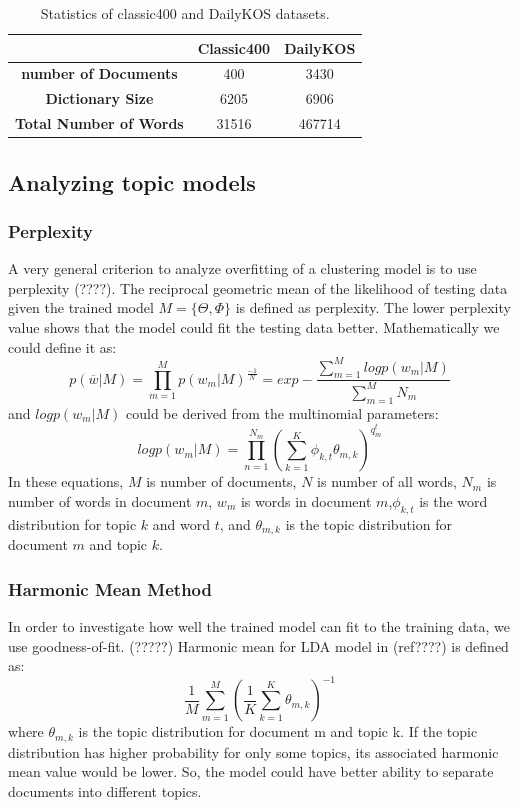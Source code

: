 \documentclass[twoside,12pt]{article}
\begin{document}
\begin{table}
\vspace{-2cm}
\center
\begin{tabular}{|c|c|c|}
\hline
 & \textbf{Classic400} & \textbf{DailyKOS} \\
 \hline
\textbf{ number of Documents} & 400 & 3430 \\
\textbf{ Dictionary Size} & 6205 & 6906 \\
\textbf{ Total Number of Words} & 31516 & 467714\\
 \hline
\end{tabular}
\caption{Statistics of classic400 and DailyKOS datasets.}
\label{tableDatasetStats}
\end{table}

\subsection{Analyzing topic models}
\subsubsection{Perplexity}
A very general criterion to analyze overfitting of a clustering model is to use perplexity (????). The reciprocal geometric mean of the likelihood of testing data given the trained model $M={\{\Theta,\Phi\}}$ is defined as perplexity. The lower perplexity value shows that the model could fit the testing data better. Mathematically we could define it as:
\begin{equation}
p(\overline{w}|M)=\prod_{m=1}^M p(w_m|M)^{\frac{-1}{N}}=exp - \frac{\sum_{m=1}^Ml og p(w_m|M)}{\sum_{m=1}^M N_m}
\end{equation}
and $log p(w_m|M)$ could be derived from the multinomial parameters:
\begin{equation}
log p(w_m|M)=\prod_{n=1}^{N_m}(\sum_{k=1}^{K} \phi_{k,t}\theta_{m,k})^{q_m^t}
\end{equation}
In these equations, $M$ is number of documents, $N$ is number of all words, $N_m$ is number of words in document $m$, $w_m$ is words in document $m$,$\phi_{k,t}$ is the word distribution for topic $k$ and word $t$, and $\theta_{m,k}$ is the topic distribution for document $m$ and topic $k$.

\subsubsection{Harmonic Mean Method}
In order to investigate how well the trained model can fit to the training data, we use goodness-of-fit. (?????) Harmonic mean for LDA model in (ref????) is defined as:
\begin{equation}
\frac{1}{M}\sum_{m=1}^{M}(\frac{1}{K}\sum_{k=1}^{K}\theta_{m,k})^{-1}
\end{equation}
where $\theta_{m,k}$ is the topic distribution for document m and topic k. If the topic distribution has higher probability for only some topics, its associated harmonic mean value would be lower. So, the model could have better ability to separate documents into different topics.
\end{document}
